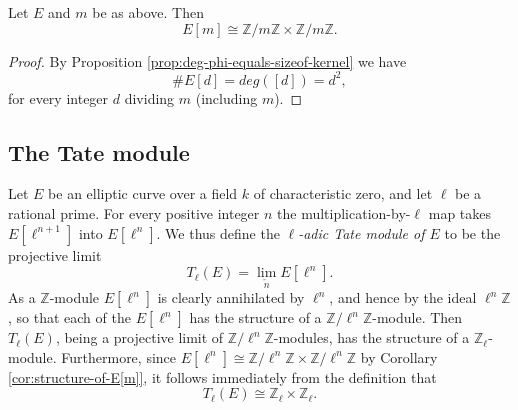 \begin{cor}
  \label{cor:structure-of-E[m]}
  Let $E$ and $m$ be as above.  Then
  \begin{equation*}
    E[m] \cong \mathbb{Z} / m \mathbb{Z} \times \mathbb{Z} / m \mathbb{Z}.
  \end{equation*}
\end{cor}
\begin{proof}
  By Proposition \ref{prop:deg-phi-equals-sizeof-kernel} we have
  \begin{equation*}
    \# E[d] = deg([d]) = d^{2},
  \end{equation*}
  for every integer $d$ dividing $m$ (including $m$).
\end{proof}

\subsection{The Tate module}
\label{sec:tate-module}

Let $E$ be an elliptic curve over a field $k$ of characteristic zero, and let $\ell$
be a rational prime.  For every positive integer $n$ the multiplication-by-$\ell$ map
takes $E[\ell^{n+1}]$ into $E[\ell^{n}]$.  We thus define the \emph{$\ell$-adic Tate
  module of $E$} to be the projective limit
\begin{equation*}
  T_{\ell}(E) =  \lim_{\overleftarrow{n}} E[\mathcal{\ell}^{n}].
\end{equation*}
As a $\mathbb{Z}$-module $E[\ell^{n}]$ is clearly annihilated by $\ell^{n}$, and
hence by the ideal $\ell^{n}\mathbb{Z}$, so that each of the $E[\ell^{n}]$ has the
structure of a $\mathbb{Z}/\ell^{n}\mathbb{Z}$-module.  Then $T_{\ell}(E)$, being a
projective limit of $\mathbb{Z}/\ell^{n}\mathbb{Z}$-modules, has the structure of a
$\mathbb{Z}_{\ell}$-module.  Furthermore, since $E[\ell^{n}] \cong
\mathbb{Z}/\ell^{n}\mathbb{Z} \times \mathbb{Z}/\ell^{n}\mathbb{Z}$ by Corollary
\ref{cor:structure-of-E[m]}, it follows immediately from the definition that
\begin{equation}
  \label{eq:structure-of-Tate-module}
  T_{\ell}(E) \cong \mathbb{Z}_{\ell} \times \mathbb{Z}_{\ell}.  
\end{equation}

